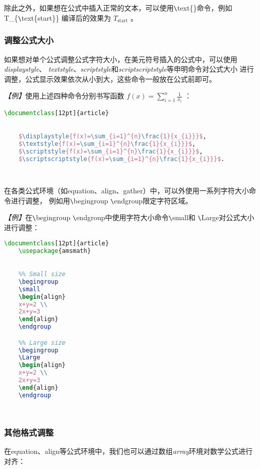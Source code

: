 除此之外，如果想在公式中插入正常的文本，可以使用\verb|\|text\{\}命令，例如T\_\{\verb|\|text\{start\}\}
编译后的效果为 $T_{\text{start}}$ 。

\subsubsection{调整公式大小}
如果想对单个公式调整公式字符大小，在美元符号插入的公式中，可以使用\emph{displaystyle}、
\emph{textstyle}、\emph{scriptstyle}和\emph{scriptscriptstyle}等申明命令对公式大小
进行调整，公式显示效果依次从小到大，这些命令一般放在公式前即可。

\emph{【例】}使用上述四种命令分别书写函数 $f(x)=\sum_{i=1}^{n}\frac{1}{x_{i}}$ ：
\begin{lstlisting}[language=TeX]
    \documentclass[12pt]{article}
    

    $\displaystyle{f(x)=\sum_{i=1}^{n}\frac{1}{x_{i}}}$, 
    $\textstyle{f(x)=\sum_{i=1}^{n}\frac{1}{x_{i}}}$,
    $\scriptstyle{f(x)=\sum_{i=1}^{n}\frac{1}{x_{i}}}$,
    $\scriptscriptstyle{f(x)=\sum_{i=1}^{n}\frac{1}{x_{i}}}$.

    
\end{lstlisting}

在各类公式环境（如equation、align、gather）中，可以外使用一系列字符大小命令进行调整，
例如用\verb|\|begingroup \verb|\|endgroup限定字符区域。

\emph{【例】}在\verb|\|begingroup \verb|\|endgroup中使用字符大小命令\verb|\|small和
\verb|\|Large对公式大小进行调整：
\begin{lstlisting}[language=TeX]
    \documentclass[12pt]{article}
    \usepackage{amsmath}
    

    %% Small size
    \begingroup
    \small
    \begin{align}
    x+y=2 \\
    2x+y=3
    \end{align}
    \endgroup

    %% Large size
    \begingroup
    \Large
    \begin{align}
    x+y=2 \\
    2x+y=3
    \end{align}
    \endgroup

    
\end{lstlisting}

\subsubsection{其他格式调整}
在equation、align等公式环境中，我们也可以通过数组\emph{array}环境对数学公式进行对齐：

